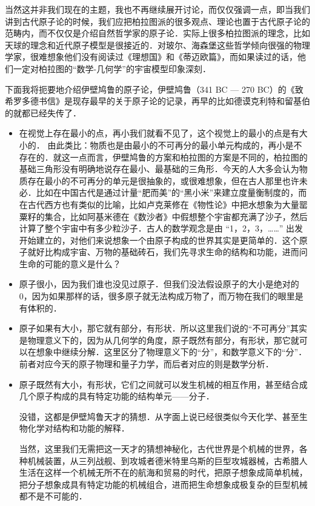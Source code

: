 当然这并非我们现在的主题，我也不再继续展开讨论，而仅仅强调一点，即当我们讲到古代原子论的时候，我们应把柏拉图派的很多观点、理论也置于古代原子论的范畴内，而不仅仅是介绍自然哲学家的原子论．实际上很多柏拉图派的理念，比如天球的理念和近代原子模型是很接近的．对玻尔、海森堡这些哲学倾向很强的物理学家，很难想象他们没有阅读过《理想国》和《蒂迈欧篇》，而如果读过的话，他们一定对柏拉图的“数学-几何学”的宇宙模型印象深刻．

下面我将扼要地介绍伊壁鸠鲁的原子论，伊壁鸠鲁（341 BC — 270 BC）的《致希罗多德书信》是现存最早的关于原子论的记录，再早的比如德谟克利特和留基伯的就都已经失传了．

\begin{itemize}
\item 在视觉上存在最小的点，再小我们就看不见了，这个视觉上的最小的点是有大小的． 由此类比：物质也是由最小的不可再分的最小单元构成的，再小是不存在的．就这一点而言，伊壁鸠鲁的方案和柏拉图的方案是不同的，柏拉图的基础三角形没有明确地说存在最小、最基础的三角形．今天的人大多会认为物质存在最小的不可再分的单元是很抽象的，或很难想象，但在古人那里也许未必．比如在中国古代是通过计量“肥而美”的“黑小米”来建立度量衡制度的，而在古代西方也有类似的比喻，比如卢克莱修在《物性论》中把水想象为大量罂粟籽的集合，比如阿基米德在《数沙者》中假想整个宇宙都充满了沙子，然后计算了整个宇宙中有多少粒沙子．古人的数学观念是由 “1，2，3，……” 出发开始建立的，对他们来说想象一个由原子构成的世界其实是更简单的．这个原子就好比构成宇宙、万物的基础砖石，我们先寻求生命的结构和功能，进而问生命的可能的意义是什么？

\item 原子很小，因为我们谁也没见过原子．但我们没法假设原子的大小是绝对的0，因为如果那样的话，很多原子就无法构成万物了，而万物在我们的眼里是有体积的．

\item 原子如果有大小，那它就有部分，有形状．所以这里我们说的“不可再分”其实是物理意义下的，因为从几何学的角度，原子既然有部分，有形状，那它就可以在想象中继续分解．这里区分了物理意义下的“分”，和数学意义下的“分”．前者对应今天的原子物理和量子力学，而后者对应的则是数学分析．

\item 
原子既然有大小，有形状，它们之间就可以发生机械的相互作用，甚至结合成几个原子构成的具有特定功能的结构单元——分子．

没错，这都是伊壁鸠鲁天才的猜想．从字面上说已经很类似今天化学、甚至生物化学对结构和功能的解释．

当然，这里我们无需把这一天才的猜想神秘化，古代世界是个机械的世界，各种机械装置，从三列战舰、到攻城者德米特里乌斯的巨型攻城器械，古希腊人生活在这样一个机械无所不在的航海和贸易的时代，把原子想象成简单机械，把分子想象成具有特定功能的机械组合，进而把生命想象成极复杂的巨型机械都不是不可能的．
\end{itemize}

